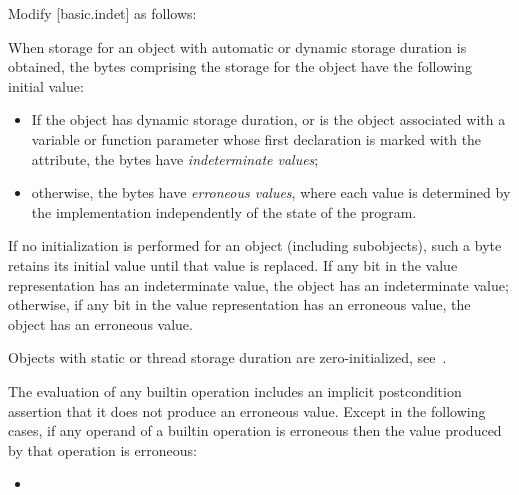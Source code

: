 Modify [basic.indet] as follows:

\begin{adjustwidth}{0.5cm}{0.5cm}
When storage for an object with automatic or dynamic storage duration
is obtained,
the bytes comprising the storage for the object
have the following initial value:
\begin{itemize}
\item
If the object has dynamic storage duration, or
is the object associated with a variable or function parameter
whose first declaration is marked with
the \tcode{[[indeterminate]]} attribute,
the bytes have \emph{indeterminate values};
\item
otherwise, the bytes have \emph{erroneous values},
where each value is determined by the implementation
independently of the state of the program.
\end{itemize}
If no initialization is performed for an object (including subobjects),
such a byte retains its initial value
until that value is replaced.
If any bit in the value representation has an indeterminate value,
the object has an indeterminate value;
otherwise, if any bit in the value representation has an erroneous value,
the object has an erroneous value.

\begin{note}
Objects with static or thread storage duration are zero-initialized,
see~.
\end{note}


\begin{addedblock}
The evaluation of any builtin operation includes an implicit postcondition assertion 
that it does not produce an erroneous value.  Except in the following cases,
if any operand of a builtin operation is erroneous then the value
produced by that operation is erroneous:
\begin{itemize}
\item  %
\end{itemize}
\end{addedblock}


\end{adjustwidth}
